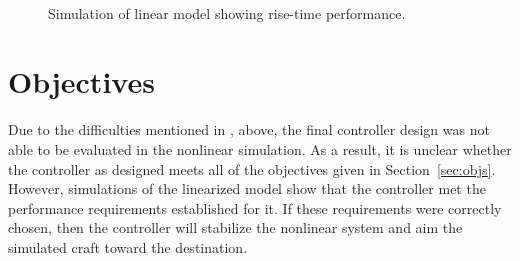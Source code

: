 \documentclass{sydeStyle}
\begin{document}
\begin{figure}
    \centering
     \\
    \caption{Simulation of linear model showing rise-time performance.}
    \label{fig:linrisetime}
\end{figure}

\pagebreak

\section{Objectives}
Due to the difficulties mentioned in , above, the final
controller design was not able to be evaluated in the nonlinear simulation.  As
a result, it is unclear whether the controller as designed meets all of the
objectives given in Section~\ref{sec:objs}.  However, simulations of the
linearized model show that the controller met the performance requirements
established for it.  If these requirements were correctly chosen, then the
controller will stabilize the nonlinear system and aim the simulated craft
toward the destination.
\end{document}
